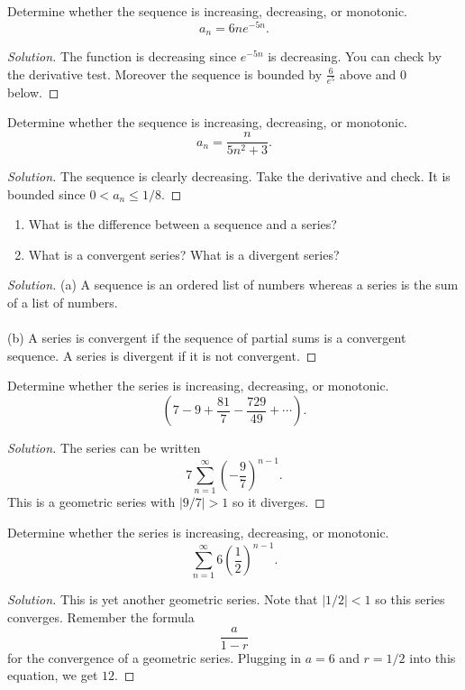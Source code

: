 \begin{problem}[HW 20, \# 2]
Determine whether the sequence is increasing, decreasing, or monotonic.
\[
a_n=6ne^{-5n}.
\]
\end{problem}
\begin{proof}[Solution]
The function is decreasing since $e^{-5n}$ is decreasing. You can check by
the derivative test. Moreover the sequence is bounded by $\frac{6}{e^5}$
above and $0$ below.
\end{proof}

\begin{problem}[HW 20, \# 3]
Determine whether the sequence is increasing, decreasing, or monotonic.
\[
a_n=\frac{n}{5n^2+3}.
\]
\end{problem}
\begin{proof}[Solution]
The sequence is clearly decreasing. Take the derivative and check. It is
bounded since $0<a_n\leq 1/8$.
\end{proof}

\begin{problem}[HW 20, \# 4]
\begin{enumerate}[label=(\alph*),noitemsep]
\item What is the difference between a sequence and a series?
\item What is a convergent series? What is a divergent series?
\end{enumerate}
\end{problem}
\begin{proof}[Solution]
(a) A sequence is an ordered list of numbers whereas a series is the sum of
a list of numbers.
\\\\
(b) A series is convergent if the sequence of partial sums is a convergent
sequence. A series is divergent if it is not convergent.
\end{proof}

\begin{problem}[HW 20, \# 5]
Determine whether the series is increasing, decreasing, or monotonic.
\[
\left(7-9+\frac{81}{7}-\frac{729}{49}+\cdots\right).
\]
\end{problem}
\begin{proof}[Solution]
The series can be written
\[
7\sum_{n=1}^\infty\left(-\frac{9}{7}\right)^{n-1}.
\]
This is a geometric series with $|9/7|>1$ so it diverges.
\end{proof}

\begin{problem}[HW 20, \# 6]
Determine whether the series is increasing, decreasing, or monotonic.
\[
\sum_{n=1}^\infty 6\left(\frac{1}{2}\right)^{n-1}.
\]
\end{problem}
\begin{proof}[Solution]
This is yet another geometric series. Note that $|1/2|<1$ so this series
converges. Remember the formula
\begin{equation}
  \label{eq:geometric-series}
\frac{a}{1-r}
\end{equation}
for the convergence of a geometric series. Plugging in $a=6$ and $r=1/2$
into this equation, we get $12$.
\end{proof}

